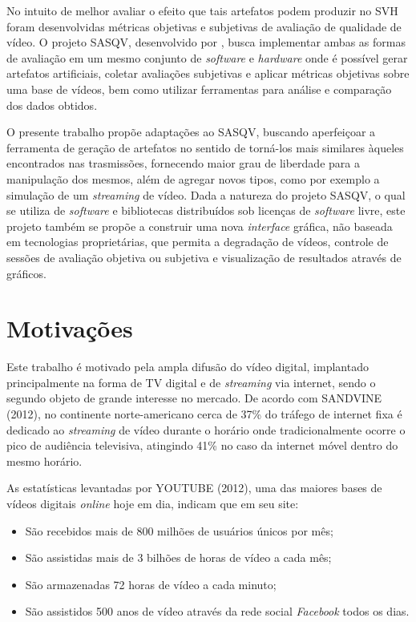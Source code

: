 No intuito de melhor avaliar o efeito que tais artefatos podem produzir no SVH foram desenvolvidas métricas objetivas e subjetivas de avaliação de qualidade de vídeo. O projeto SASQV, desenvolvido por \cite{sasqv}, busca implementar ambas as formas de avaliação em um mesmo conjunto de \emph{software} e \emph{hardware} onde é possível gerar artefatos artificiais, coletar avaliações subjetivas e aplicar métricas objetivas sobre uma base de vídeos, bem como utilizar ferramentas para análise e comparação dos dados obtidos.

O presente trabalho propõe adaptações ao SASQV, buscando aperfeiçoar a ferramenta de geração de artefatos no sentido de torná-los mais similares àqueles encontrados nas trasmissões, fornecendo maior grau de liberdade para a manipulação dos mesmos, além de agregar novos tipos, como por exemplo a simulação de um \emph{streaming} de vídeo. Dada a natureza do projeto SASQV, o qual se utiliza de \emph{software} e bibliotecas distribuídos sob licenças de \emph{software} livre, este projeto também se propõe a construir uma nova \emph{interface} gráfica, não baseada em tecnologias proprietárias, que permita a degradação de vídeos, controle de sessões de avaliação objetiva ou subjetiva e visualização de resultados através de gráficos.

\section{Motivações}

Este trabalho é motivado pela ampla difusão do vídeo digital, implantado principalmente na forma de TV digital e de \emph{streaming} via internet, sendo o segundo objeto de grande interesse no mercado. De acordo com SANDVINE (2012)\nocite{sandvinereport}, no continente norte-americano cerca de 37\% do tráfego de internet fixa é dedicado ao \emph{streaming} de vídeo durante o horário onde tradicionalmente ocorre o pico de audiência televisiva, atingindo 41\% no caso da internet móvel dentro do mesmo horário.

As estatísticas levantadas por YOUTUBE (2012)\nocite{statsyoutube}, uma das maiores bases de vídeos digitais \emph{online} hoje em dia, indicam que em seu site:
\begin{itemize}
    \item São recebidos mais de 800 milhões de usuários únicos por mês;
    \item São assistidas mais de 3 bilhões de horas de vídeo a cada mês;
    \item São armazenadas 72 horas de vídeo a cada minuto;
    \item São assistidos 500 anos de vídeo através da rede social \emph{Facebook} todos os dias.
\end{itemize}

